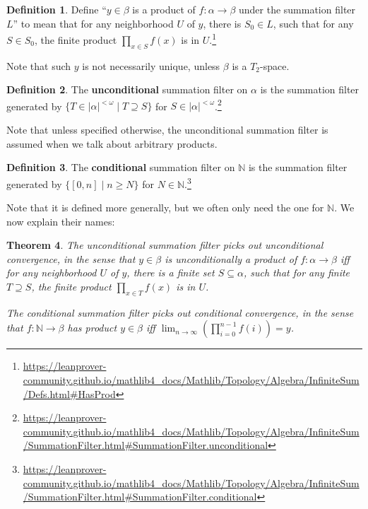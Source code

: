 \documentclass[12pt]{amsart}
\newtheorem{theorem}{Theorem}[subsection]
\theoremstyle{definition}
\newtheorem{definition}[theorem]{Definition}
\theoremstyle{remark}
\numberwithin{equation}{subsection}
\newcommand{\N}{\mathbb N}
\begin{document}
\begin{definition}
    Define ``$y \in \beta$ is a product of $f : \alpha \to \beta$ under the summation filter $L$'' to mean that for any neighborhood $U$ of $y$, there is $S_0 \in L$, such that for any $S \in S_0$, the finite product $\prod_{x \in S} f(x)$ is in $U$.\footnote{\url{https://leanprover-community.github.io/mathlib4_docs/Mathlib/Topology/Algebra/InfiniteSum/Defs.html\#HasProd}}
\end{definition}

Note that such $y$ is not necessarily unique, unless $\beta$ is a $T_2$-space.

\begin{definition}
    The \textbf{unconditional} summation filter on $\alpha$ is the summation filter generated by $\{T \in |\alpha|^{<\omega} \mid T \supseteq S\}$ for $S \in |\alpha|^{<\omega}$.\footnote{\url{https://leanprover-community.github.io/mathlib4_docs/Mathlib/Topology/Algebra/InfiniteSum/SummationFilter.html\#SummationFilter.unconditional}}
\end{definition}

Note that unless specified otherwise, the unconditional summation filter is assumed when we talk about arbitrary products.

\begin{definition}
    The \textbf{conditional} summation filter on $\N$ is the summation filter generated by $\{[0,n] \mid n \ge N\}$ for $N \in \N$.\footnote{\url{https://leanprover-community.github.io/mathlib4_docs/Mathlib/Topology/Algebra/InfiniteSum/SummationFilter.html\#SummationFilter.conditional}}
\end{definition}

Note that it is defined more generally, but we often only need the one for $\N$. We now explain their names:

\begin{theorem}
    The unconditional summation filter picks out unconditional convergence, in the sense that $y \in \beta$ is unconditionally a product of $f : \alpha \to \beta$ iff for any neighborhood $U$ of $y$, there is a finite set $S \subseteq \alpha$, such that for any finite $T \supseteq S$, the finite product $\prod_{x \in T} f(x)$ is in $U$.

    The conditional summation filter picks out conditional convergence, in the sense that $f : \N \to \beta$ has product $y \in \beta$ iff $\lim_{n \to \infty} \left( \prod_{i=0}^{n-1} f(i) \right) = y$.
\end{theorem}
\end{document}
